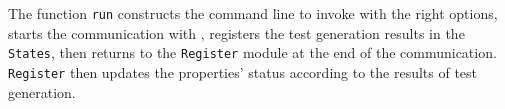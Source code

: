 \documentclass[web]{frama-c-book}
\begin{document}
The function \lstinline[language=OCaml]'run' constructs the command line to invoke \pathcrawler with the right options, starts the communication with \pathcrawler, registers the test generation results in the \lstinline[language=OCaml]'States', then returns to the \lstinline[language=OCaml]'Register' module at the end of the communication.
\lstinline[language=OCaml]'Register' then updates the properties' status according to the results of test generation.



\appendix



\cleardoublepage
{}
{}




\cleardoublepage
{}
{}
\listoffigures


\cleardoublepage
{}
{}
\printindex
\end{document}
